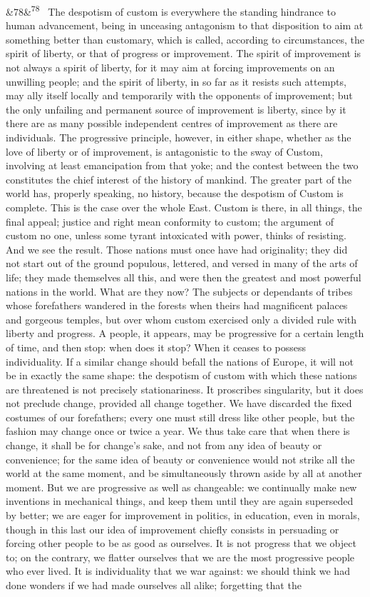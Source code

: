 \documentclass[12pt]{article}
\newcommand{\para}[1][]{\par\noindent\ifx&#1&\else\textsuperscript{\footnotesize #1}~\fi}
\begin{document}
\para[78] The despotism of custom is everywhere the standing hindrance to human advancement, being in unceasing antagonism to that disposition to aim at something better than customary, which is called, according to circumstances, the spirit of liberty, or that of progress or improvement. The spirit of improvement is not always a spirit of liberty, for it may aim at forcing improvements on an unwilling people; and the spirit of liberty, in so far as it resists such attempts, may ally itself locally and temporarily with the opponents of improvement; but the only unfailing and permanent source of improvement is liberty, since by it there are as many possible independent centres of improvement as there are individuals. The progressive principle, however, in either shape, whether as the love of liberty or of improvement, is antagonistic to the sway of Custom, involving at least emancipation from that yoke; and the contest between the two constitutes the chief interest of the history of mankind. The greater part of the world has, properly speaking, no history, because the despotism of Custom is complete. This is the case over the whole East. Custom is there, in all things, the final appeal; justice and right mean conformity to custom; the argument of custom no one, unless some tyrant intoxicated with power, thinks of resisting. And we see the result. Those nations must once have had originality; they did not start out of the ground populous, lettered, and versed in many of the arts of life; they made themselves all this, and were then the greatest and most powerful nations in the world. What are they now? The subjects or dependants of tribes whose forefathers wandered in the forests when theirs had magnificent palaces and gorgeous temples, but over whom custom exercised only a divided rule with liberty and progress. A people, it appears, may be progressive for a certain length of time, and then stop: when does it stop? When it ceases to possess individuality. If a similar change should befall the nations of Europe, it will not be in exactly the same shape: the despotism of custom with which these nations are threatened is not precisely stationariness. It proscribes singularity, but it does not preclude change, provided all change together. We have discarded the fixed costumes of our forefathers; every one must still dress like other people, but the fashion may change once or twice a year. We thus take care that when there is change, it shall be for change's sake, and not from any idea of beauty or convenience; for the same idea of beauty or convenience would not strike all the world at the same moment, and be simultaneously thrown aside by all at another moment. But we are progressive as well as changeable: we continually make new inventions in mechanical things, and keep them until they are again superseded by better; we are eager for improvement in politics, in education, even in morals, though in this last our idea of improvement chiefly consists in persuading or forcing other people to be as good as ourselves. It is not progress that we object to; on the contrary, we flatter ourselves that we are the most progressive people who ever lived. It is individuality that we war against: we should think we had done wonders if we had made ourselves all alike; forgetting that the 
\end{document}
